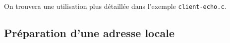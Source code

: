 



On trouvera une utilisation plus détaillée dans l'exemple
\texttt{client-echo.c}.

\subsection{Préparation d'une adresse locale}







